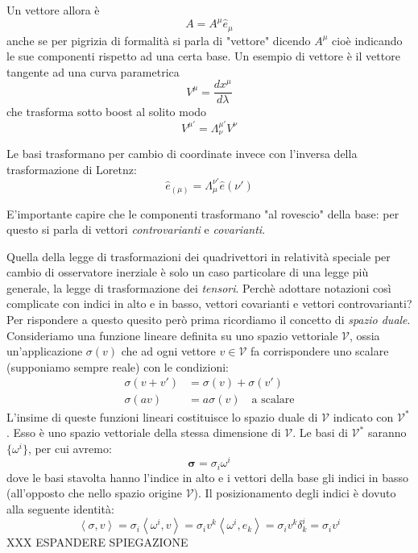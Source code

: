 \documentclass[twoside]{article}
\begin{document}
Un vettore allora è
\begin{equation}
	A = A^\mu \hat{e}_{\mu}
\end{equation}
anche se per pigrizia di formalità si parla di "vettore" dicendo $A^{\mu}$ cioè indicando le sue componenti rispetto ad una certa base. Un esempio di vettore è il vettore tangente ad una curva parametrica 
$$
V^{\mu} = \dfrac{d x^\mu}{d\lambda}
$$
che trasforma sotto boost al solito modo
\begin{equation}
	V^{\mu'} = \Lambda^{\mu'}_{\nu} V^{\nu}
\end{equation}

Le basi trasformano per cambio di coordinate invece con l'inversa della trasformazione di Loretnz:
\begin{equation}
	\hat{e}_{(\mu)} = \Lambda^{\nu'}_{\mu} \hat{e}(\nu')
\end{equation}

E'importante capire che le componenti trasformano "al rovescio" della base: per questo si parla di vettori \emph{controvarianti} e \emph{covarianti}.

Quella della legge di trasformazioni dei quadrivettori in relatività speciale per cambio di osservatore inerziale è solo un caso particolare di una legge più generale, la legge di trasformazione dei \emph{tensori}.
Perchè adottare notazioni così complicate con indici in alto e in basso, vettori covarianti e vettori controvarianti? Per rispondere a questo quesito però prima ricordiamo il concetto di \emph{spazio duale}.
Consideriamo una funzione lineare definita su uno spazio vettoriale $\mathcal{V}$, ossia un'applicazione $\sigma(v)$ che ad ogni vettore $v\in \mathcal{V}$ fa corrispondere uno scalare (supponiamo sempre reale) con le condizioni:
\begin{align*}
	\sigma(v+v') & = \sigma(v)+\sigma(v') \\
	\sigma(a v)  & = a \sigma(v) \quad \textrm{a scalare}
\end{align*}
L'insime di queste funzioni lineari costituisce lo spazio duale di $\mathcal{V}$ indicato con $\mathcal{V}^*$. Esso è uno spazio vettoriale della stessa dimensione di $\mathcal{V}$.
Le basi di $\mathcal{V}^*$ saranno $\{ \omega^i \}$, per cui avremo:
\begin{equation}
	\boldsymbol{\sigma} = \sigma_i \omega^i
\end{equation}
dove le basi stavolta hanno l'indice in alto e i vettori della base gli indici in basso (all'opposto che nello spazio origine $\mathcal{V}$). Il posizionamento degli indici è dovuto alla seguente identità:
\begin{equation}
	\left< \sigma, v \right > = \sigma_i \left < \omega^i, v \right > = \sigma_i v^k \left < \omega^i, e_k \right >
	= \sigma_i v^k \delta^i_k = \sigma_i v^i
\end{equation}
XXX ESPANDERE SPIEGAZIONE 
\end{document}
